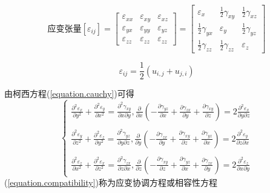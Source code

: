 \documentclass{article}
\begin{document}
\begin{equation}
\text{应变张量}
[\varepsilon_{ij}]=
\left[
  \begin{array}{ccc}
  \varepsilon_{xx} & \varepsilon_{xy} & \varepsilon_{xz} \\
  \varepsilon_{yx} & \varepsilon_{yy} & \varepsilon_{yz} \\
  \varepsilon_{zz} & \varepsilon_{zz} & \varepsilon_{zz}
  \end{array}
\right]
=
\left[
  \begin{array}{ccc}
  \varepsilon_{x} & \frac{1}{2}\gamma_{xy} & \frac{1}{2}\gamma_{xz} \\
  \frac{1}{2}\gamma_{yx} & \varepsilon_{y} & \frac{1}{2}\gamma_{yz} \\
  \frac{1}{2}\gamma_{zz} & \frac{1}{2}\gamma_{zz} & \varepsilon_{z}
  \end{array}
\right]
\end{equation}

\begin{equation}
 \varepsilon_{ij}=\frac{1}{2}(u_{i,j}+u_{j,i})
\end{equation}

由柯西方程(\ref{equation.cauchy})可得
\begin{equation}
  \left\{
	\begin{array}{ll}
	\frac{\partial^2 \varepsilon_x }{\partial y^2} + \frac{\partial^2 \varepsilon_y }{\partial x^2} = \frac{\partial^2 \gamma_{xy}}{\partial x\partial y} , \frac{\partial}{\partial x}(- \frac{\partial \gamma_{yz}}{\partial x} +\frac{\partial \gamma_{zx}}{\partial y} +\frac{\partial \gamma_{xy}}{\partial z} ) = 2 \frac{\partial^2 \varepsilon_x}{\partial y\partial z}
	\\\\
	\frac{\partial^2 \varepsilon_y }{\partial z^2} + \frac{\partial^2 \varepsilon_z }{\partial y^2} = \frac{\partial^2 \gamma_{yz}}{\partial y\partial z} , \frac{\partial}{\partial y}(- \frac{\partial \gamma_{zx}}{\partial y} +\frac{\partial \gamma_{xy}}{\partial z} +\frac{\partial \gamma_{yz}}{\partial x} ) = 2 \frac{\partial^2 \varepsilon_y}{\partial z\partial x}
\\\\
	\frac{\partial^2 \varepsilon_z }{\partial x^2} + \frac{\partial^2 \varepsilon_x }{\partial z^2} = \frac{\partial^2 \gamma_{zx}}{\partial z\partial x} , \frac{\partial}{\partial z}(- \frac{\partial \gamma_{xy}}{\partial z} +\frac{\partial \gamma_{yz}}{\partial x} +\frac{\partial \gamma_{zx}}{\partial y} ) = 2 \frac{\partial^2 \varepsilon_z}{\partial x\partial y}
	\end{array}
	\right.
\label{equation.compatibility}
\end{equation}
(\ref{equation.compatibility})称为应变协调方程或相容性方程\\
\end{document}
